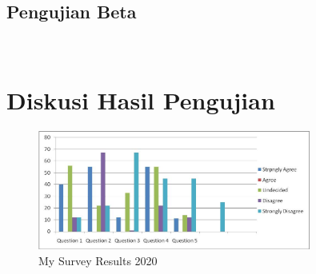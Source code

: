 \subsection{Pengujian Beta}

\blindtext \\


\section{Diskusi Hasil Pengujian}

\begin{figure}
	\centering
	\includegraphics[width=0.8\textwidth]
	{pics/graph1.jpg}
	\caption{My Survey Results 2020}
	\label{fig:42}
\end{figure}

\blindtext \\
